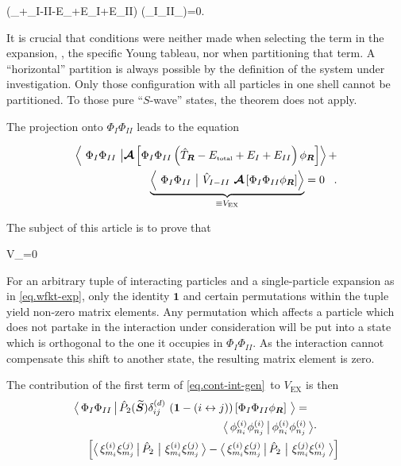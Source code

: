 \documentclass[aps,prd,twocolumn,tightenlines,letterpaper,nofootinbib]{revtex4-1}
\begin{document}
\be{}
\left(_{}+_{I-II}-E_+E_I+E_{II}\right)
\asy\big(\Phi_I\Phi_{II}\phi_{}\big)=0\;\;\;.
\ee

It is crucial that conditions were neither made when selecting the term in
the expansion, \ie, the specific Young tableau, nor when partitioning
that term. A ``horizontal'' partition is always possible by the definition
of the system under investigation. Only those configuration with all 
particles in one shell cannot be partitioned. To those pure ``$S$-wave''
states, the theorem does not apply.

The projection onto $\Phi_I\Phi_{II}$ leads to the equation

\begin{align}\la{eq.schroe-pro}
\left\langle~\Phi_I\Phi_{II}~\big\vert\asy\left[\Phi_I\Phi_{II}\left(\hat{T}_{\ve{R}}-E_\text{\tiny total}+E_I+E_{II}
\right)\phi_{\ve{R}}\right]\right\rangle+\nonumber\\
\underbrace{\left\langle~\Phi_I\Phi_{II}~\big\vert~\hat{V}_{I-II}~\asy\left[\Phi_I\Phi_{II}\phi_{\ve{R}}\right]\right\rangle}_{\equiv V_\text{EX}}=0\;\;\;.%
\end{align}

The subject of this article is to prove that

\be{}
V_=0\;\;
\ee

For an arbitrary tuple of interacting particles and a 
single-particle expansion as in \eqref{eq.wfkt-exp}, only
the identity $\bm{1}$ and certain permutations within the tuple
yield non-zero matrix elements. 
Any permutation which affects a particle which does not partake in
the interaction under consideration will be put into a state which
is orthogonal to the one it occupies in $\Phi_I\Phi_{II}$. As the
interaction cannot compensate this shift to another state, the
resulting matrix element is zero.

The contribution of the first term of \eqref{eq.cont-int-gen}~to
$V_\text{EX}$ is then
\begin{align}\la{eq.ex-2}
\ov{\Phi_I\Phi_{II}}{\hat{P}_2(\widetilde{\ve{S}})\delta^{(d)}_{ij}
~(\bm{1}-(i\leftrightarrow j))
\left[\Phi_I\Phi_{II}\phi_{\ve{R}}\right]}=\hspace{1cm}
\nonumber\\
\ov{\phi^{(i)}_{n_i}\phi^{(i)}_{n_j}}
{\phi^{(i)}_{n_i}\phi^{(i)}_{n_j}}\cdot\hspace{.7cm}
\nonumber\\
\Big[\ov{\xi^{(i)}_{m_i}\xi^{(j)}_{m_j}}{\hat{P}_2
~\big\vert~\xi^{(i)}_{m_i}\xi^{(j)}_{m_j}}-
\ov{\xi^{(i)}_{m_i}\xi^{(j)}_{m_j}}{\hat{P}_2
~\big\vert~\xi^{(j)}_{m_i}\xi^{(i)}_{m_j}}\Big]
\nonumber\\
\end{align}
\end{document}

